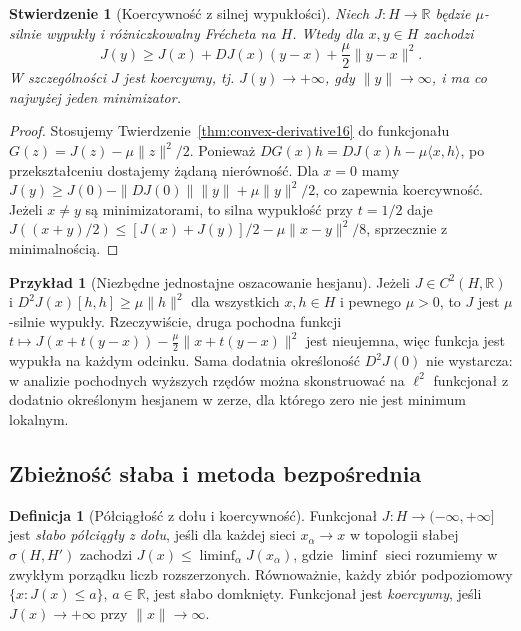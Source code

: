 \documentclass[11pt,a4paper]{article}
\numberwithin{equation}{section}
\theoremstyle{plain}
\newtheorem{stwierdzenie}[twierdzenie]{Stwierdzenie}
\theoremstyle{definition}
\newtheorem{definicja}[twierdzenie]{Definicja}
\newtheorem{przyklad}[twierdzenie]{Przykład}
\theoremstyle{remark}
\newcommand{\R}{\mathbb R}
\begin{document}
\begin{stwierdzenie}[Koercywność z silnej wypukłości]
\label{prop:strong-coercive16}
Niech $J:H\to\R$ będzie $\mu$-silnie wypukły i
różniczkowalny Frécheta na $H$. Wtedy dla $x,y\in H$
zachodzi
\[
J(y)\ge J(x)+DJ(x)(y-x)+\frac\mu2\|y-x\|^2.
\]
W szczególności $J$ jest koercywny, tj.
$J(y)\to+\infty$, gdy $\|y\|\to\infty$,
i ma co najwyżej jeden minimizator.
\end{stwierdzenie}
\begin{proof}
Stosujemy Twierdzenie~\ref{thm:convex-derivative16}
do funkcjonału $G(z)=J(z)-\mu\|z\|^2/2$.
Ponieważ $DG(x)h=DJ(x)h-\mu\langle x,h\rangle$,
po przekształceniu dostajemy żądaną nierówność.
Dla $x=0$ mamy
$J(y)\ge J(0)-\|DJ(0)\|\|y\|+\mu\|y\|^2/2$,
co zapewnia koercywność. Jeżeli $x\ne y$ są minimizatorami,
to silna wypukłość przy $t=1/2$ daje
$J((x+y)/2)\le [J(x)+J(y)]/2-\mu\|x-y\|^2/8$,
sprzecznie z minimalnością.
\end{proof}

\begin{przyklad}[Niezbędne jednostajne oszacowanie hesjanu]
\label{ex:variational-hessian16}
Jeżeli $J\in C^2(H,\R)$ i
$D^2J(x)[h,h]\ge\mu\|h\|^2$ dla wszystkich
$x,h\in H$ i pewnego $\mu>0$, to $J$ jest
$\mu$-silnie wypukły. Rzeczywiście, druga pochodna
funkcji $t\mapsto J(x+t(y-x))-
\frac\mu2\|x+t(y-x)\|^2$ jest nieujemna,
więc funkcja jest wypukła na każdym odcinku.
Sama dodatnia określoność $D^2J(0)$ nie wystarcza:
w analizie pochodnych wyższych rzędów można skonstruować
na $\ell^2$ funkcjonał z dodatnio określonym hesjanem
w zerze, dla którego zero nie jest minimum lokalnym.
\end{przyklad}

\subsection{Zbieżność słaba i metoda bezpośrednia}

\begin{definicja}[Półciągłość z dołu i koercywność]
\label{def:weak-lsc16}
Funkcjonał $J:H\to(-\infty,+\infty]$ jest
\emph{słabo półciągły z dołu}, jeśli dla każdej sieci
$x_\alpha\to x$ w topologii słabej $\sigma(H,H')$
zachodzi $J(x)\le\liminf_\alpha J(x_\alpha)$,
gdzie $\liminf$ sieci rozumiemy w zwykłym porządku liczb
rozszerzonych. Równoważnie, każdy zbiór podpoziomowy
$\{x:J(x)\le a\}$, $a\in\R$, jest słabo domknięty.
Funkcjonał jest \emph{koercywny}, jeśli $J(x)\to+\infty$
przy $\|x\|\to\infty$.
\end{definicja}
\end{document}
